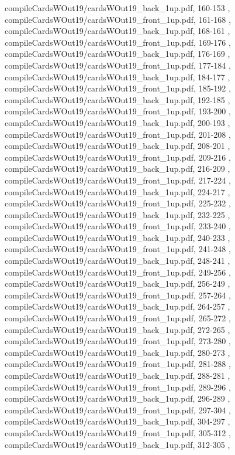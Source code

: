 \documentclass[letterpaper]{article}
\begin{document}
{									compileCardsWOut19/cardsWOut19_back_1up.pdf,			160-153		,
									compileCardsWOut19/cardsWOut19_front_1up.pdf,		161-168		,
									compileCardsWOut19/cardsWOut19_back_1up.pdf,			168-161		,
									compileCardsWOut19/cardsWOut19_front_1up.pdf,		169-176		,
									compileCardsWOut19/cardsWOut19_back_1up.pdf,			176-169		,
									compileCardsWOut19/cardsWOut19_front_1up.pdf,		177-184		,
									compileCardsWOut19/cardsWOut19_back_1up.pdf,			184-177		,
									compileCardsWOut19/cardsWOut19_front_1up.pdf,		185-192		,
									compileCardsWOut19/cardsWOut19_back_1up.pdf,			192-185		,
									compileCardsWOut19/cardsWOut19_front_1up.pdf,		193-200		,
									compileCardsWOut19/cardsWOut19_back_1up.pdf,			200-193		,
									compileCardsWOut19/cardsWOut19_front_1up.pdf,		201-208		,
									compileCardsWOut19/cardsWOut19_back_1up.pdf,			208-201		,
									compileCardsWOut19/cardsWOut19_front_1up.pdf,		209-216		,
									compileCardsWOut19/cardsWOut19_back_1up.pdf,			216-209		,
									compileCardsWOut19/cardsWOut19_front_1up.pdf,		217-224		,
									compileCardsWOut19/cardsWOut19_back_1up.pdf,			224-217		,
									compileCardsWOut19/cardsWOut19_front_1up.pdf,		225-232		,
									compileCardsWOut19/cardsWOut19_back_1up.pdf,			232-225		,
									compileCardsWOut19/cardsWOut19_front_1up.pdf,		233-240		,
									compileCardsWOut19/cardsWOut19_back_1up.pdf,			240-233		,
									compileCardsWOut19/cardsWOut19_front_1up.pdf,		241-248		,
									compileCardsWOut19/cardsWOut19_back_1up.pdf,			248-241		,
									compileCardsWOut19/cardsWOut19_front_1up.pdf,		249-256		,
									compileCardsWOut19/cardsWOut19_back_1up.pdf,			256-249		,
									compileCardsWOut19/cardsWOut19_front_1up.pdf,		257-264		,
									compileCardsWOut19/cardsWOut19_back_1up.pdf,			264-257		,
									compileCardsWOut19/cardsWOut19_front_1up.pdf,		265-272		,
									compileCardsWOut19/cardsWOut19_back_1up.pdf,			272-265		,
									compileCardsWOut19/cardsWOut19_front_1up.pdf,		273-280		,
									compileCardsWOut19/cardsWOut19_back_1up.pdf,			280-273		,
									compileCardsWOut19/cardsWOut19_front_1up.pdf,		281-288		,
									compileCardsWOut19/cardsWOut19_back_1up.pdf,			288-281		,
									compileCardsWOut19/cardsWOut19_front_1up.pdf,		289-296		,
									compileCardsWOut19/cardsWOut19_back_1up.pdf,			296-289		,
									compileCardsWOut19/cardsWOut19_front_1up.pdf,		297-304		,
									compileCardsWOut19/cardsWOut19_back_1up.pdf,			304-297		,
									compileCardsWOut19/cardsWOut19_front_1up.pdf,		305-312		,
									compileCardsWOut19/cardsWOut19_back_1up.pdf,			312-305		,
}
\end{document}

